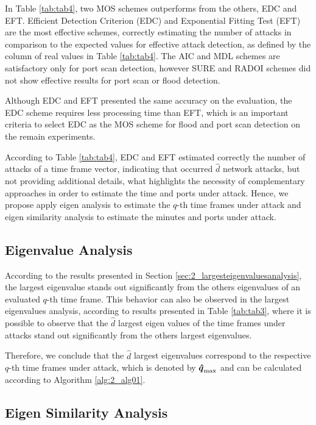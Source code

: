 In Table \ref{tab:tab4}, two MOS schemes outperforms from the others, EDC and EFT. Efficient Detection Criterion (EDC) and Exponential Fitting Test (EFT) are the most effective schemes, correctly estimating the number of attacks in comparison to the expected values for effective attack detection, as defined by the column of real values in Table \ref{tab:tab4}. The AIC and MDL schemes are satisfactory only for port scan detection, however SURE and RADOI schemes did not show effective results for port scan or flood detection.

Although EDC and EFT presented the same accuracy on the evaluation, the EDC scheme requires less processing time than EFT, which is an important criteria to select EDC as the MOS scheme for flood and port scan detection on the remain experiments.

According to Table \ref{tab:tab4}, EDC and EFT estimated correctly the number of attacks of a time frame vector, indicating that occurred $\hat{d}$ network attacks, but not providing additional details, what highlights the necessity of complementary approaches in order to estimate the time and ports under attack. Hence, we propose apply eigen analysis to estimate the $q$-th time frames under attack and eigen similarity analysis to estimate the minutes and ports under attack.

\subsection{Eigenvalue Analysis}
\label{sec:2_EigenvalueAnalysis}

According to the results presented in Section \ref{sec:2_largesteigenvaluesanalysis}, the largest eigenvalue stands out significantly from the others eigenvalues of an evaluated $q$-th time frame. This behavior can also be observed in the largest eigenvalues analysis, according to results presented in Table \ref{tab:tab3}, where it is possible to observe that the $\hat{d}$ largest eigen values of the time frames under attacks stand out significantly from the others largest eigenvalues. 

Therefore, we conclude that the $\hat{d}$ largest eigenvalues correspond to the respective $q$-th time frames under attack, which is denoted by $\rm{\boldsymbol{\hat{q}}}_{\rm max}$ and can be calculated according to Algorithm \ref{alg:2_alg01}.

\subsection{Eigen Similarity Analysis}
\label{sec:2_EigenSimilarityAnalysis}

